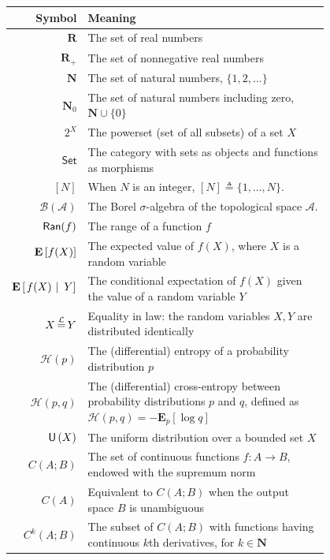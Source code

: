 {%
\begin{longtable}[h]{|r p{0.8\linewidth}|}
  \hline
  \rowcolor{white}
  \textbf{Symbol} & \textbf{Meaning}\\
  \hline
  $\mathbf{R}$ & The set of real numbers\\
  $\mathbf{R}_+$ & The set of nonnegative real numbers\\
  $\mathbf{N}$ & The set of natural numbers, $\{1, 2,\dots\}$\\
  $\mathbf{N}_0$ & The set of natural numbers including zero, $\mathbf{N}\cup\{0\}$\\
  $2^X$ & The powerset (set of all subsets) of a set $X$\\
  $\mathsf{Set}$ & The category with sets as objects and functions as morphisms\\
  $[N]$ & When $N$ is an integer, $[N]\triangleq\{1,\dots,N\}$.\\
  $\mathscr{B}(\mathcal{A})$ & The Borel $\sigma$-algebra of the
                               topological space $\mathcal{A}$.\\
  $\operatorname{\mathsf{Ran}}(f)$ & The range of a function $f$\\
  $\underset{}{\mathbf{E}}\left[f(X)\right]$ & The expected value of $f(X)$, where $X$ is a
                    random variable\\
  $\underset{}{\mathbf{E}}\left[\left. f(X)\ \right\rvert\ Y\right]$ & The conditional expectation of $f(X)$
                                given the value of a random variable $Y$\\
  $X \operatorname{\overset{\mathcal{L}}{=}} Y$ & Equality in law: the random variables $X,Y$ are
                 distributed identically\\
  $\mathcal{H}(p)$ & The (differential) entropy of a probability
                     distribution $p$\\
  $\mathcal{H}(p, q)$ & The (differential) cross-entropy between
                        probability distributions $p$ and $q$, defined
                        as $\mathcal{H}(p, q) = -\mathbf{E}_{p}[\log q]$\\
  $\mathsf{U}\left(X\right)$ & The uniform distribution over a bounded
  set $X$\\
  $C(A; B)$ & The set of continuous functions $f:A\to B$, endowed
           with the supremum norm\\
  $C(A)$ & Equivalent to $C(A;B)$ when the output space $B$ is unambiguous\\
  $C^k(A; B)$ & The subset of $C(A;B)$ with functions having continuous
             $k$th derivatives, for $k\in\mathbf{N}$\\

\end{longtable}}
